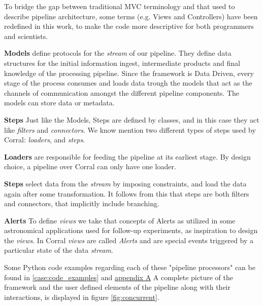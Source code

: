 \documentclass[final,5p,times,twocolumn,authoryear]{elsarticle}
\begin{document}
To bridge the gap between traditional MVC terminology and that used to describe pipeline architecture, some terms (e.g. Views and Controllers) have been redefined in this work, to make the code more descriptive for both programmers and scientists.
%
\begin{description}
\item   \textbf{Models} define protocols for the \textit{stream} of our pipeline. They define data
        structures for the initial information ingest,
        intermediate products and final knowledge of the processing pipeline.
        Since the framework is Data Driven, every stage of the process
        consumes and loads data trough the models that act as the channels of communication amongst the different pipeline components. The models can store data or metadata.
\item   \textbf{Steps} Just like the Models, Steps are defined by classes, and in this case they
        act like \textit{filters} and \textit{connectors}.
        We know mention two different types of steps used by Corral: \textit{loaders}, and \textit{steps}.
        \begin{description}
        \item   \textbf{Loaders} are responsible for feeding the pipeline at its earliest stage. By design choice, a pipeline over Corral can only have one loader.
        \item   \textbf{Steps} select data from the \textit{stream} by imposing constraints,
                and load the data again after some transformation. It follows from this
                that steps are both filters and connectors, that implicitly include branching.
        \end{description}
\item   \textbf{Alerts} To define \textit{views} we take that concepts of Alerts as utilized in some astronomical applications used for follow-up experiments, as inspiration to design the \textit{views}.
        In Corral \textit{views} are called \textit{Alerts} and are special events triggered by a particular state of the data \textit{stream}.
\end{description}
%
Some Python code examples regarding each of these "pipeline processors" can be found in
\autoref{case:code_examples} and \hyperref[appendixa]{appendix A}
%
A complete picture of the framework and the user defined elements of the pipeline
along with their interactions,
is displayed in figure \ref{fig:concurrent}.
%
\end{document}

